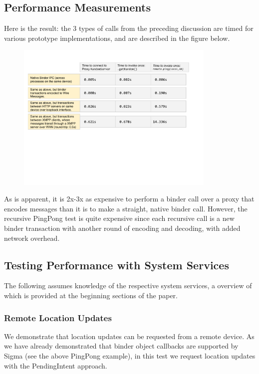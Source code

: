 \documentclass[prodmode]{acmlarge}
\begin{document}
\subsection{Performance Measurements}
Here is the result: the 3 types of calls from the preceding discussion are timed for various prototype implementations, and are described in the figure below.

\begin{figure}[h]
\centering
\includegraphics[width=0.85\textwidth]{drawings/Performance.pdf}
\end{figure}

As is apparent, it is 2x-3x as expensive to perform a binder call over a proxy that encodes messages than it is to make a straight, native binder call. However, the recursive PingPong test is quite expensive since each recursive call is a new binder transaction with another round of encoding and decoding, with added network overhead.

\subsection{Testing Performance with System Services}

The following assumes knowledge of the respective system services, a overview of which is provided at the beginning sections of the paper.

\subsubsection{Remote Location Updates}
We demonstrate that location updates can be requested from a remote device. As we have already demonstrated that binder object callbacks are supported by Sigma (see the above PingPong example), in this test we request location updates with the PendingIntent approach.
\end{document}
